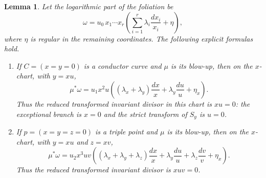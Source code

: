 \documentclass[11pt]{amsart}
\numberwithin{equation}{section}
\theoremstyle{plain}
\newtheorem{Lemma}[Theorem]{Lemma}
\theoremstyle{definition}
\begin{document}
\begin{Lemma} \label{lem:coordinate-pullback}
Let the logarithmic part of the foliation be
\[
\omega=u_0\,x_1\cdots x_r\left(\sum_{i=1}^r\lambda_i\frac{dx_i}{x_i}+\eta\right),
\]
where $\eta$ is regular in the remaining coordinates.  The following explicit formulas hold.
\begin{enumerate}[label=\textup{(\alph*)},leftmargin=2.4em]
\item If $C=(x=y=0)$ is a conductor curve and $\mu$ is its blow-up, then on the $x$-chart, with $y=xu$,
\begin{equation}\label{eq:curve-pullback}
\mu^*\omega
=u_1x^2u\left((\lambda_x+\lambda_y)\frac{dx}{x}+\lambda_y\frac{du}{u}+\eta_x\right).
\end{equation}
Thus the reduced transformed invariant divisor in this chart is $xu=0$: the exceptional branch is $x=0$ and the strict transform of $S_y$ is $u=0$.
\item If $p=(x=y=z=0)$ is a triple point and $\mu$ is its blow-up, then on the $x$-chart, with $y=xu$ and $z=xv$,
\begin{equation}\label{eq:triple-pullback}
\mu^*\omega
=u_2x^3uv\left((\lambda_x+\lambda_y+\lambda_z)\frac{dx}{x}+\lambda_y\frac{du}{u}+\lambda_z\frac{dv}{v}+\eta_x\right).
\end{equation}
Thus the reduced transformed invariant divisor is $xuv=0$.
\end{enumerate}
\end{Lemma}
\end{document}

